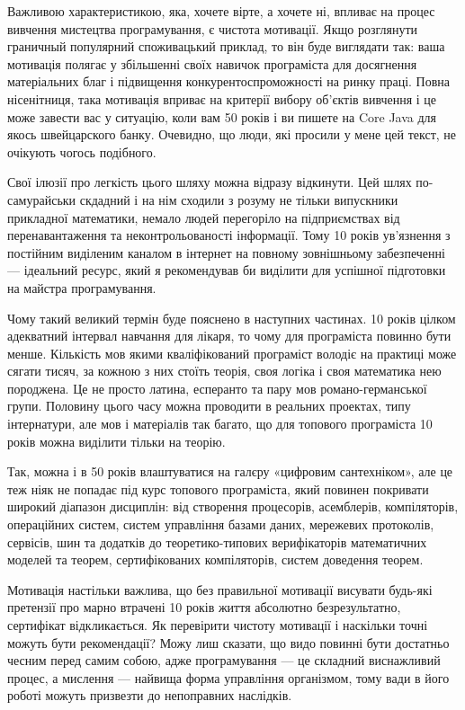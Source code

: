 Важливою характеристикою, яка, хочете вірте, а хочете ні,
впливає на процес вивчення мистецтва програмування, є чистота мотивації.
Якщо розглянути граничный популярний споживацький приклад, то він буде виглядати так:
ваша мотивація полягає у збільшенні своїх навичок програміста для
досягнення матеріальних благ і підвищення конкурентоспроможності
на ринку праці. Повна нісенітниця, така мотивація вприває на критерії
вибору об'єктів вивчення і це може завести вас у ситуацію, коли вам
50 років і ви пишете на Core Java для якось швейцарского банку.
Очевидно, що люди, які просили у мене цей текст, не очікують чогось подібного.

Свої ілюзії про легкість цього шляху можна відразу відкинути.
Цей шлях по-самурайськи скдадний і на нім сходили з розуму не тільки
випускники прикладної математики, немало людей перегоріло на
підприємствах від перенавантаження та неконтрольованості інформації.
Тому 10 років ув'язнення з постійним виділеним
каналом в інтернет на повному зовнішньому забезпеченні ---
ідеальний ресурс, який я рекомендував би виділити для успішної
підготовки на майстра програмування.

Чому такий великий термін буде пояснено в наступних частинах.
10 років цілком адекватний інтервал навчання для лікаря, то чому для програміста повинно бути менше.
Кількість мов якими кваліфікований програміст володіє на практиці може сягати тисяч,
за кожною з них стоїть теорія, своя логіка і своя математика нею породжена.
Це не просто латина, есперанто та пару мов романо-германської групи.
Половину цього часу можна проводити в реальних проектах, типу інтернатури,
але мов і матеріалів так багато, що для топового програміста 10 років можна виділити тільки на теорію.

Так, можна і в 50 років влаштуватися на галєру «цифровим сантехніком»,
але це теж ніяк не попадає під курс топового програміста, який повинен
покривати широкий діапазон дисциплін: від створення процесорів, асемблерів,
компіляторів, операційних систем, систем управління базами даних, мережевих протоколів,
сервісів, шин та додатків до теоретико-типових верифікаторів математичних
моделей та теорем, сертифікованих компіляторів, систем доведення теорем.

Мотивація настільки важлива, що без правильної мотивації висувати будь-які претензії
про марно втрачені 10 років життя абсолютно безрезультатно, сертифікат відкликається.
Як перевірити чистоту мотивації і наскільки точні можуть бути рекомендації?
Можу лиш сказати, що видо повинні бути достатньо чесним перед самим собою, адже програмування
--- це складний виснажливий процес, а мислення --- найвища форма управління організмом, тому
вади в його роботі можуть призвезти до непоправних наслідків.

